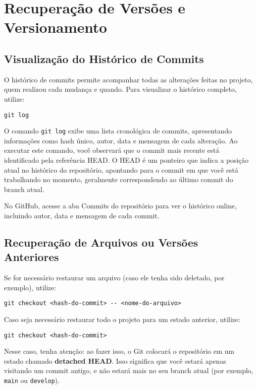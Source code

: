 \newpage

\section{Recuperação de Versões e Versionamento}

\subsection{Visualização do Histórico de Commits}

O histórico de commits permite acompanhar todas as alterações feitas no projeto, quem realizou cada mudança e quando. Para visualizar o histórico completo, utilize:

\begin{lstlisting}[style=shellstyle]
git log
\end{lstlisting}

O comando \texttt{git log} exibe uma lista cronológica de commits, apresentando informações como hash único, autor, data e mensagem de cada alteração. Ao executar este comando, você observará que o commit mais recente está identificado pela referência HEAD. O HEAD é um ponteiro que indica a posição atual no histórico do repositório, apontando para o commit em que você está trabalhando no momento, geralmente correspondendo ao último commit do branch atual.

No GitHub, acesse a aba Commits do repositório para ver o histórico online, incluindo autor, data e mensagem de cada commit.

\subsection{Recuperação de Arquivos ou Versões Anteriores}

Se for necessário restaurar um arquivo (caso ele tenha sido deletado, por exemplo), utilize:

\begin{lstlisting}[style=shellstyle]
git checkout <hash-do-commit> -- <nome-do-arquivo>
\end{lstlisting}

Caso seja necessário restaurar todo o projeto para um estado anterior, utilize:

\begin{lstlisting}[style=shellstyle]
git checkout <hash-do-commit>
\end{lstlisting}

Nesse caso, tenha atenção: ao fazer isso, o Git colocará o repositório em um estado chamado \textbf{detached HEAD}. Isso significa que você estará apenas visitando um commit antigo, e não estará mais no seu branch atual (por exemplo, \texttt{main} ou \texttt{develop}).  

